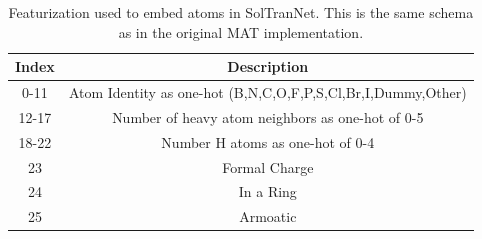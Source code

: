 \documentclass[journal=jcisd8,manuscript=article]{achemso}
\begin{document}
\begin{table}
    \begin{tabular}{|c|c|}
        \hline
         Index & Description \\
         \hline
         0-11 & Atom Identity as one-hot (B,N,C,O,F,P,S,Cl,Br,I,Dummy,Other) \\
         12-17 & Number of heavy atom neighbors as one-hot of 0-5 \\
         18-22 & Number H atoms as one-hot of 0-4 \\
         23 & Formal Charge \\
         24 & In a Ring \\
         25 & Armoatic \\
         \hline
    \end{tabular}
    \caption{Featurization used to embed atoms in SolTranNet. This is the same schema as in the original MAT implementation. }
    \label{tab:atomembed}
\end{table}
\end{document}
